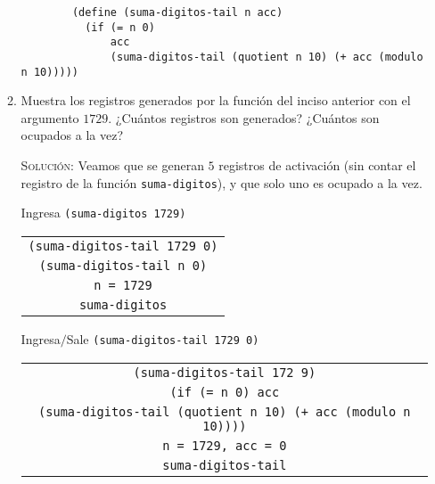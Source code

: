 \documentclass[letterpaper,11pt]{article}
\begin{document}
\begin{enumerate}
\begin{enumerate}
\begin{verbatim}
        (define (suma-digitos-tail n acc)
          (if (= n 0)
              acc
              (suma-digitos-tail (quotient n 10) (+ acc (modulo n 10)))))
        \end{verbatim}

        \item Muestra los registros generados por la función del inciso anterior 
        con el argumento $1729$. ¿Cuántos registros son generados? ¿Cuántos son 
        ocupados a la vez?

        \textsc{Solución:} Veamos que se generan $5$ registros de activación (sin 
        contar el registro de la función \texttt{suma-digitos}), y que solo uno es
        ocupado a la vez.

        Ingresa \texttt{(suma-digitos 1729)}
        \begin{center}
            \begin{tabular}[h]{|c|}
                \hline
                \texttt{(suma-digitos-tail 1729 0)} \\
                \texttt{(suma-digitos-tail n 0)} \\
                \texttt{n = 1729} \\
                \texttt{suma-digitos} \\
                \hline
            \end{tabular}
        \end{center}

        Ingresa$/$Sale \texttt{(suma-digitos-tail 1729 0)}
        \begin{center}
            \begin{tabular}[h]{|c|}
                \hline
                \texttt{(suma-digitos-tail 172 9)} \\
                \texttt{(if (= n 0) acc} \\
                \texttt{(suma-digitos-tail (quotient n 10) 
                (+ acc (modulo n 10))))} \\
                \texttt{n = 1729, acc = 0} \\
                \texttt{suma-digitos-tail} \\
                \hline
            \end{tabular}
        \end{center}


\end{enumerate}
\end{enumerate}
\end{document}
